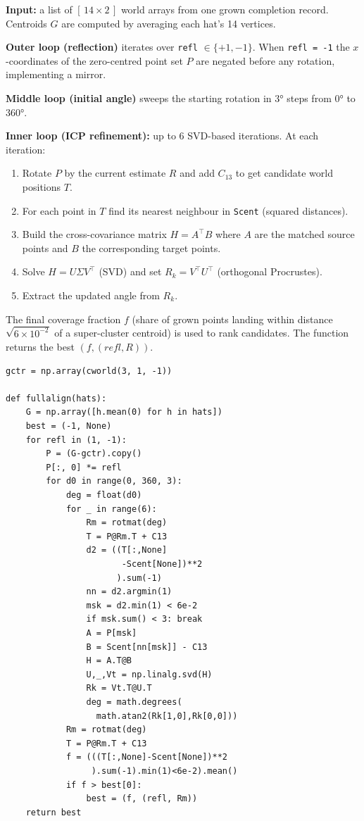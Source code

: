 \documentclass[10pt,a4paper]{article}
\newcommand{\code}[1]{\texttt{\small #1}}
\begin{document}
\begin{tcolorbox}[dualbox, title={\code{fullalign(hats)} — find best rigid transform}]
  \textbf{Input:} a list of $[\,14\times 2\,]$ world arrays from one grown
  completion record.  Centroids $G$ are computed by averaging each hat's
  14 vertices.

  \medskip
  \textbf{Outer loop (reflection)} iterates over \code{refl} $\in \{+1, -1\}$.
  When \code{refl = -1} the $x$-coordinates of the zero-centred point set $P$
  are negated before any rotation, implementing a mirror.

  \medskip
  \textbf{Middle loop (initial angle)} sweeps the starting rotation in $3°$
  steps from $0°$ to $360°$.

  \medskip
  \textbf{Inner loop (ICP refinement):} up to 6 SVD-based iterations.
  At each iteration:
  \begin{enumerate}
    \item Rotate $P$ by the current estimate $R$ and add $C_{13}$ to get
      candidate world positions $T$.
    \item For each point in $T$ find its nearest neighbour in \code{Scent}
      (squared distances).
    \item Build the cross-covariance matrix $H = A^{\top}B$ where $A$ are the
      matched source points and $B$ the corresponding target points.
    \item Solve $H = U\Sigma V^{\top}$ (SVD) and set $R_k = V^{\top}U^{\top}$
      (orthogonal Procrustes).
    \item Extract the updated angle from $R_k$.
  \end{enumerate}
  The final coverage fraction $f$ (share of grown points landing within
  distance $\sqrt{6\times 10^{-2}}$ of a super-cluster centroid) is used
  to rank candidates.  The function returns the best $(f, (\mathit{refl}, R))$.
\tcblower
\begin{verbatim}
gctr = np.array(cworld(3, 1, -1))

def fullalign(hats):
    G = np.array([h.mean(0) for h in hats])
    best = (-1, None)
    for refl in (1, -1):
        P = (G-gctr).copy()
        P[:, 0] *= refl
        for d0 in range(0, 360, 3):
            deg = float(d0)
            for _ in range(6):
                Rm = rotmat(deg)
                T = P@Rm.T + C13
                d2 = ((T[:,None]
                       -Scent[None])**2
                      ).sum(-1)
                nn = d2.argmin(1)
                msk = d2.min(1) < 6e-2
                if msk.sum() < 3: break
                A = P[msk]
                B = Scent[nn[msk]] - C13
                H = A.T@B
                U,_,Vt = np.linalg.svd(H)
                Rk = Vt.T@U.T
                deg = math.degrees(
                  math.atan2(Rk[1,0],Rk[0,0]))
            Rm = rotmat(deg)
            T = P@Rm.T + C13
            f = (((T[:,None]-Scent[None])**2
                 ).sum(-1).min(1)<6e-2).mean()
            if f > best[0]:
                best = (f, (refl, Rm))
    return best
\end{verbatim}
\end{tcolorbox}
\end{document}
